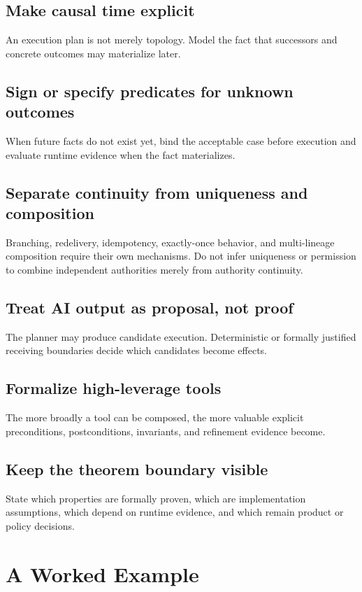 \documentclass[10pt,oneside,openany]{book}
\begin{document}
\section{Make causal time explicit}
An execution plan is not merely topology. Model the fact that successors and concrete outcomes may materialize later.

\section{Sign or specify predicates for unknown outcomes}
When future facts do not exist yet, bind the acceptable case before execution and evaluate runtime evidence when the fact materializes.

\section{Separate continuity from uniqueness and composition}
Branching, redelivery, idempotency, exactly-once behavior, and multi-lineage composition require their own mechanisms. Do not infer uniqueness or permission to combine independent authorities merely from authority continuity.

\section{Treat AI output as proposal, not proof}
The planner may produce candidate execution. Deterministic or formally justified receiving boundaries decide which candidates become effects.

\section{Formalize high-leverage tools}
The more broadly a tool can be composed, the more valuable explicit preconditions, postconditions, invariants, and refinement evidence become.

\section{Keep the theorem boundary visible}
State which properties are formally proven, which are implementation assumptions, which depend on runtime evidence, and which remain product or policy decisions.

\chapter{A Worked Example}
\end{document}

